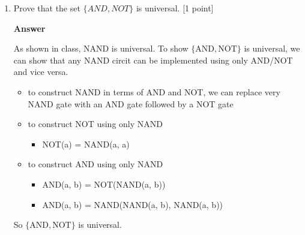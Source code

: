 \documentclass[11pt]{article}
\newcommand \kw[1]{\textbf{#1}}
\newenvironment{answer}{
\vspace{.5cm}
\kw{Answer}
}
{

}
\begin{document}
\begin{enumerate}
\begin{answer}
In order to decode:
\begin{itemize}
    \item keep reading until 01 reached
    \item chop the part that was read off and decode the numbers using standard PFE decoder for natural numbers to get a list of neighbors in ith index
    \item draw graph w/ edges to neighbors indicated by list
    \item repeat until all bits have been read
\end{itemize}

To count the number of bits:
\begin{itemize}
    \item for $n \in N, |E(n)| = log_2(n)$
    \item the PFE of each number will take $log_2(n) + 2log_2(log_2(n)) + 2$ bits
    \item so each list will be $10(log_2(n) + 2log_2(log_2(n)) + 2)$ bits
    \item the PFE of a list will then be $10(log_2(n) + 2log_2(log_2(n)) + 2) + 2log_2(10(log_2(n) + 2log_2(log_2(n)) + 2)) + 2$ bits
    \item so in total we have $n(10(log_2(n) + 2log_2(log_2(n)) + 2) + 2log_2(10(log_2(n) + 2log_2(log_2(n)) + 2)) + 2)$ bits since we have n lists 
    \item this is less than $1000nlog_2n$ for sufficiently large n 
\end{itemize}

\qed
\end{answer}

\pagebreak

\item Prove that the set $\{AND,NOT\}$ is universal. [1 point] 

\begin{answer}
As shown in class, NAND is universal. To show $\{\text{AND},\text{NOT}\}$ is universal, we can show that any NAND circit can be implemented using only AND/NOT and vice versa.
\begin{itemize}
    \item to construct NAND in terms of AND and NOT, we can replace very NAND gate with an AND gate followed by a NOT gate
    \item to construct NOT using only NAND
    \begin{itemize}
        \item NOT(a) = NAND(a, a)
    \end{itemize}
    \item to construct AND using only NAND
    \begin{itemize}
        \item AND(a, b) = NOT(NAND(a, b))
        \item AND(a, b) = NAND(NAND(a, b), NAND(a, b))
    \end{itemize}
\end{itemize}
So $\{\text{AND},\text{NOT}\}$ is universal. 


\end{answer}
\end{enumerate}
\end{document}
